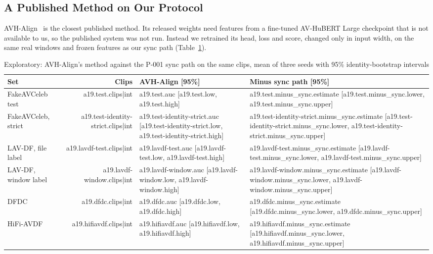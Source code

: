 \subsection{A Published Method on Our Protocol}

AVH-Align~\cite{smeu2025} is the closest published method. Its released
weights need features from a fine-tuned AV-HuBERT Large checkpoint that is not
available to us, so the published system was not run. Instead we retrained its
head, loss and score, changed only in input width, on the same real windows and
frozen features as our sync path (Table~\ref{tab:a19}).

\begin{table}[htbp]
    \centering
    \caption{Exploratory: AVH-Align's method against the P-001 sync path on the same clips, mean of three seeds with 95\% identity-bootstrap intervals}
    \label{tab:a19}
    \begin{tabular}{lrll}
        \toprule
        \textbf{Set} & \textbf{Clips} & \textbf{AVH-Align [95\%]} & \textbf{Minus sync path [95\%]} \\
        \midrule
        FakeAVCeleb test & {{a19.test.clips|int}} & {{a19.test.auc}} [{{a19.test.low}}, {{a19.test.high}}] & {{a19.test.minus_sync.estimate}} [{{a19.test.minus_sync.lower}}, {{a19.test.minus_sync.upper}}] \\
        FakeAVCeleb, strict & {{a19.test-identity-strict.clips|int}} & {{a19.test-identity-strict.auc}} [{{a19.test-identity-strict.low}}, {{a19.test-identity-strict.high}}] & {{a19.test-identity-strict.minus_sync.estimate}} [{{a19.test-identity-strict.minus_sync.lower}}, {{a19.test-identity-strict.minus_sync.upper}}] \\
        LAV-DF, file label & {{a19.lavdf-test.clips|int}} & {{a19.lavdf-test.auc}} [{{a19.lavdf-test.low}}, {{a19.lavdf-test.high}}] & {{a19.lavdf-test.minus_sync.estimate}} [{{a19.lavdf-test.minus_sync.lower}}, {{a19.lavdf-test.minus_sync.upper}}] \\
        LAV-DF, window label & {{a19.lavdf-window.clips|int}} & {{a19.lavdf-window.auc}} [{{a19.lavdf-window.low}}, {{a19.lavdf-window.high}}] & {{a19.lavdf-window.minus_sync.estimate}} [{{a19.lavdf-window.minus_sync.lower}}, {{a19.lavdf-window.minus_sync.upper}}] \\
        DFDC & {{a19.dfdc.clips|int}} & {{a19.dfdc.auc}} [{{a19.dfdc.low}}, {{a19.dfdc.high}}] & {{a19.dfdc.minus_sync.estimate}} [{{a19.dfdc.minus_sync.lower}}, {{a19.dfdc.minus_sync.upper}}] \\
        HiFi-AVDF & {{a19.hifiavdf.clips|int}} & {{a19.hifiavdf.auc}} [{{a19.hifiavdf.low}}, {{a19.hifiavdf.high}}] & {{a19.hifiavdf.minus_sync.estimate}} [{{a19.hifiavdf.minus_sync.lower}}, {{a19.hifiavdf.minus_sync.upper}}] \\
        \bottomrule
    \end{tabular}
\end{table}

